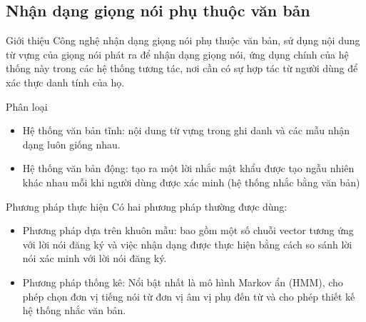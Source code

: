 \documentclass[notheorems, aspectratio=54]{beamer}
\begin{document}
\subsection{Nhận dạng giọng nói phụ thuộc văn bản}
\begin{frame}{Giới thiệu}
	Công nghệ nhận dạng giọng nói phụ thuộc văn bản, sử dụng nội dung từ vựng của giọng nói phát
	ra để nhận dạng giọng nói, ứng dụng chính của hệ thống này trong các hệ thống tương tác, nơi cần có sự hợp tác từ người dùng để xác thực danh tính của họ.
	
	Phân loại
	\begin{itemize}
		\item Hệ thống văn bản tĩnh: nội dung từ vựng trong ghi danh và các mẫu nhận dạng luôn giống
		nhau.
		\item Hệ thống văn bản động: tạo ra một lời nhắc mật khẩu được tạo ngẫu nhiên khác nhau mỗi
		khi người dùng được xác minh (hệ thống nhắc bằng văn bản)
	\end{itemize}
\end{frame}
\begin{frame}{Phương pháp thực hiện}
	Có hai phương pháp thường được dùng:
	\begin{itemize}
		\item Phương pháp dựa trên khuôn mẫu: bao gồm một số chuỗi vector tương ứng với lời nói đăng
		ký và việc nhận dạng được thực hiện bằng cách so sánh lời nói xác minh với lời nói đăng ký.
		\item Phương pháp thống kê: Nổi bật nhất là mô hình Markov ẩn (HMM), cho phép chọn đơn vị tiếng nói từ đơn vị âm vị phụ đến từ và cho phép thiết kế hệ thống nhắc văn bản.
	\end{itemize}
\end{frame}
\end{document}
